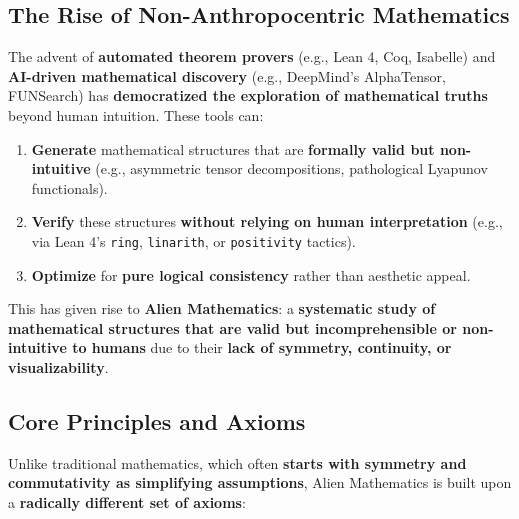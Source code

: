 \documentclass[11pt, a4paper]{article}
\begin{document}
\subsection{The Rise of Non-Anthropocentric Mathematics}
The advent of \textbf{automated theorem provers} (e.g., Lean 4, Coq, Isabelle) and \textbf{AI-driven mathematical discovery} (e.g., DeepMind’s AlphaTensor, FUNSearch) has \textbf{democratized the exploration of mathematical truths} beyond human intuition. These tools can:
\begin{enumerate}
    \item \textbf{Generate} mathematical structures that are \textbf{formally valid but non-intuitive} (e.g., asymmetric tensor decompositions, pathological Lyapunov functionals).
    \item \textbf{Verify} these structures \textbf{without relying on human interpretation} (e.g., via Lean 4’s \texttt{ring}, \texttt{linarith}, or \texttt{positivity} tactics).
    \item \textbf{Optimize} for \textbf{pure logical consistency} rather than aesthetic appeal.
\end{enumerate}

This has given rise to \textbf{Alien Mathematics}: a \textbf{systematic study of mathematical structures that are valid but incomprehensible or non-intuitive to humans} due to their \textbf{lack of symmetry, continuity, or visualizability}.

\subsection{Core Principles and Axioms}
Unlike traditional mathematics, which often \textbf{starts with symmetry and commutativity as simplifying assumptions}, Alien Mathematics is built upon a \textbf{radically different set of axioms}:
\end{document}
